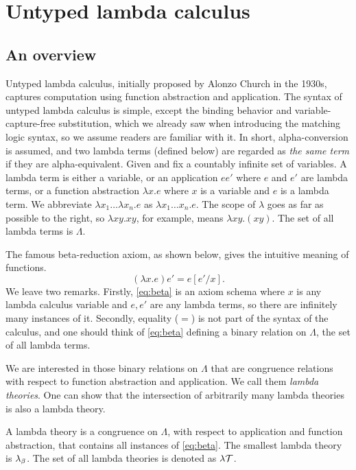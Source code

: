 \section{Untyped lambda calculus}

\subsection{An overview}

Untyped lambda calculus, initially proposed by Alonzo Church in the 1930s,
captures computation using function abstraction and application.
The syntax of untyped lambda calculus is simple,
except the binding behavior and variable-capture-free substitution,
which we already saw when introducing the matching logic syntax,
so we assume readers are familiar with it.
In short, alpha-conversion is assumed, and two lambda terms 
(defined below) are regarded as \emph{the same term} 
if they are alpha-equivalent.
Given and fix a countably infinite set of variables.
A lambda term is either a variable,
or an application $e e'$ where $e$ and $e'$ are lambda terms,
or a function abstraction $\lambda x . e$ 
where $x$ is a variable and $e$ is a lambda term.
We abbreviate $\lambda x_1 \dots \lambda x_n . e$ as
$\lambda x_1 \dots x_n . e$.
The scope of $\lambda$ goes as far as possible to the right,
so $\lambda x y . x y$, for example, means $\lambda x y . (x y)$.
The set of all lambda terms is $\Lambda$.

The famous beta-reduction axiom, as shown below,
gives the intuitive meaning of functions. 
\begin{equation}
\label{eq:beta}
\tag{$\beta$}
(\lambda x . e) e' = e[e'/x].
\end{equation}
We leave two remarks.
Firstly, \eqref{eq:beta} is an axiom schema
where $x$ is any lambda calculus variable
and $e, e'$ are any lambda terms,
so there are infinitely many instances of it.
Secondly, equality ($=$) is not part of the syntax of the calculus,
and one should think of \eqref{eq:beta}
defining a binary relation on $\Lambda$, the set of all lambda terms.

We are interested in those binary relations on $\Lambda$
that are congruence relations with respect to
function abstraction and application.
We call them \emph{lambda theories}.
One can show that the intersection of arbitrarily many lambda theories
is also a lambda theory.

A lambda theory is a congruence on $\Lambda$,
with respect to application and function abstraction,
that contains all instances of \eqref{eq:beta}.
The smallest lambda theory is $\lambda_\beta$.
The set of all lambda theories is denoted as $\lambda\mathcal{T}$.

